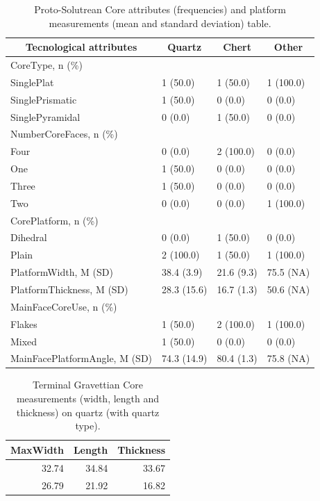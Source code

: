 \documentclass[12pt,twoside]{reedthesis}
\begin{document}
\begin{table}

\caption{\label{tab:unnamed-chunk-71}Proto-Solutrean Core attributes (frequencies) and platform measurements (mean and standard deviation) table.}
\centering
\begin{tabular}[t]{llll}
\toprule
\multicolumn{1}{c}{\textbf{Tecnological attributes}} & \multicolumn{1}{c}{\textbf{Quartz}} & \multicolumn{1}{c}{\textbf{Chert}} & \multicolumn{1}{c}{\textbf{Other}}\\
\midrule
CoreType, n (\%) &  &  & \\
SinglePlat & 1 (50.0) & 1 (50.0) & 1 (100.0)\\
SinglePrismatic & 1 (50.0) & 0 (0.0) & 0 (0.0)\\
SinglePyramidal & 0 (0.0) & 1 (50.0) & 0 (0.0)\\
NumberCoreFaces, n (\%) &  &  & \\
\addlinespace
Four & 0 (0.0) & 2 (100.0) & 0 (0.0)\\
One & 1 (50.0) & 0 (0.0) & 0 (0.0)\\
Three & 1 (50.0) & 0 (0.0) & 0 (0.0)\\
Two & 0 (0.0) & 0 (0.0) & 1 (100.0)\\
CorePlatform, n (\%) &  &  & \\
\addlinespace
Dihedral & 0 (0.0) & 1 (50.0) & 0 (0.0)\\
Plain & 2 (100.0) & 1 (50.0) & 1 (100.0)\\
PlatformWidth, M (SD) & 38.4 (3.9) & 21.6 (9.3) & 75.5 (NA)\\
PlatformThickness, M (SD) & 28.3 (15.6) & 16.7 (1.3) & 50.6 (NA)\\
MainFaceCoreUse, n (\%) &  &  & \\
\addlinespace
Flakes & 1 (50.0) & 2 (100.0) & 1 (100.0)\\
Mixed & 1 (50.0) & 0 (0.0) & 0 (0.0)\\
MainFacePlatformAngle, M (SD) & 74.3 (14.9) & 80.4 (1.3) & 75.8 (NA)\\
\bottomrule
\end{tabular}
\end{table}
\begin{table}

\caption{\label{tab:unnamed-chunk-72}Terminal Gravettian Core measurements (width, length and thickness) 
             on quartz (with quartz type).}
\centering
\begin{tabular}[t]{rrr}
\toprule
\multicolumn{1}{c}{\textbf{MaxWidth}} & \multicolumn{1}{c}{\textbf{Length}} & \multicolumn{1}{c}{\textbf{Thickness}}\\
\midrule
32.74 & 34.84 & 33.67\\
26.79 & 21.92 & 16.82\\
\bottomrule
\end{tabular}
\end{table}
\end{document}
